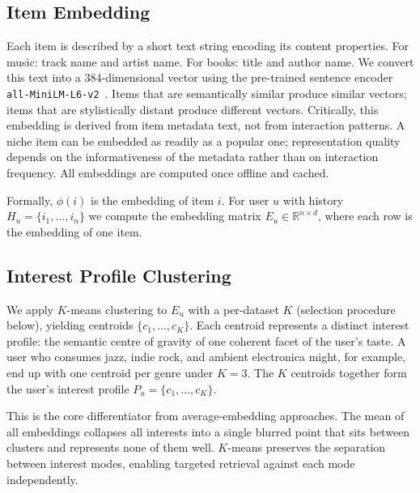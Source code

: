 \documentclass[11pt,a4paper]{article}
\begin{document}
\subsection{Item Embedding}
Each item is described by a short text string encoding its content properties.
For music: track name and artist name. For books: title and author name. We
convert this text into a 384-dimensional vector using the pre-trained sentence
encoder \texttt{all-\allowbreak MiniLM-\allowbreak L6-\allowbreak v2}~\cite{reimers2019,wang2020}. Items that are
semantically similar produce similar vectors; items that are stylistically
distant produce different vectors. Critically, this embedding is derived from item metadata text, not from
interaction patterns. A niche item can be embedded as readily as a popular
one; representation quality depends on the informativeness of the metadata
rather than on interaction frequency. All embeddings are computed once offline
and cached.

Formally, $\phi(i)$ is the embedding of item $i$. For user $u$ with history
$H_u = \{i_1, \ldots, i_n\}$ we compute the embedding matrix
$E_u \in \mathbb{R}^{n \times d}$, where each row is the embedding of one
item.

\subsection{Interest Profile Clustering}
We apply $K$-means clustering to $E_u$ with a per-dataset $K$ (selection
procedure below), yielding centroids $\{c_1, \ldots, c_K\}$. Each centroid
represents a distinct interest profile: the semantic centre of gravity of
one coherent facet of the user's taste. A user who consumes jazz, indie
rock, and ambient electronica might, for example, end up with one centroid
per genre under $K=3$. The $K$ centroids together form the user's interest
profile $P_u = \{c_1, \ldots, c_K\}$.

This is the core differentiator from average-embedding approaches. The mean
of all embeddings collapses all interests into a single blurred point that
sits between clusters and represents none of them well. $K$-means preserves
the separation between interest modes, enabling targeted retrieval against
each mode independently.
\end{document}

